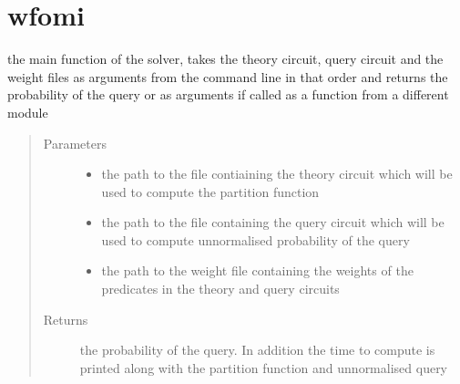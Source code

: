 \documentclass[letterpaper,10pt,english,openany,oneside]{sphinxmanual}
\begin{document}
\section{wfomi}
\label{\detokenize{index:module-wfomi}}\label{\detokenize{index:wfomi}}\label{\detokenize{index:module-0}}

\begin{fulllineitems}
\label{\detokenize{index:wfomi.wfomi}}
the main function of the solver, takes the theory circuit, query circuit and the weight files 
as arguments from the command line in that order and returns the probability of the query 
or as arguments if called as a function from a different module
\begin{quote}\begin{description}
\item[{Parameters}] \leavevmode\begin{itemize}
\item {} 
 \textendash{} the path to the file contiaining the theory circuit which will be used to compute the partition function

\item {} 
 \textendash{} the path to the file containing the query circuit which will be used to compute unnormalised probability of the query

\item {} 
 \textendash{} the path to the weight file containing the weights of the predicates in the theory and query circuits

\end{itemize}

\item[{Returns}] \leavevmode
the probability of the query. In addition the time to compute is printed along with the partition function and unnormalised query

\end{description}\end{quote}

\end{fulllineitems}
\end{document}

